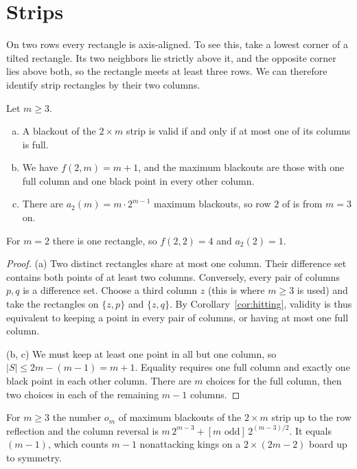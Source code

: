\section{Strips}\label{sec:strip}

On two rows every rectangle is axis-aligned. To see this, take a lowest
corner of a tilted rectangle. Its two neighbors lie strictly above it, and
the opposite corner lies above both, so the rectangle meets at least three
rows. We can therefore identify strip rectangles by their two columns.

\begin{theorem}\label{thm:strip}
Let $m\ge3$.
\begin{enumerate}[(a)]
\item A blackout of the $2\times m$ strip is valid if and only if at most one of its columns is full.
\item We have $f(2,m)=m+1$, and the maximum blackouts are those with one full column
and one black point in every other column.
\item There are $a_2(m)=m\cdot2^{m-1}$ maximum blackouts, so row $2$ of
 is  from $m=3$ on.
\end{enumerate}
For $m=2$ there is one rectangle, so $f(2,2)=4$ and $a_2(2)=1$.
\end{theorem}

\begin{proof}
(a) Two distinct rectangles share at most one column. Their difference
set contains both points of at least two columns. Conversely,
every pair of columns $p,q$ is a difference set. Choose a
third column $z$ (this is where $m\ge3$ is used) and take the rectangles on
$\{z,p\}$ and $\{z,q\}$. By Corollary~\ref{cor:hitting}, validity is thus
equivalent to keeping a point in every pair of columns, or having at most
one full column.

(b, c) We must keep at least one point in all but one column, so
$|S|\le2m-(m-1)=m+1$. Equality requires one full column and exactly one
black point in each other column. There are $m$ choices for the full
column, then two choices in each of the remaining $m-1$ columns.
\end{proof}

\begin{proposition}\label{prop:kings}
For $m\ge3$ the number $o_m$ of maximum blackouts of the $2\times m$ strip up to the row
reflection and the column reversal is $m\,2^{m-3}+[m\text{ odd}]\,2^{(m-3)/2}$. It equals
$(m-1)$, which counts $m-1$ nonattacking kings on a $2\times(2m-2)$
board up to symmetry.
\end{proposition}

